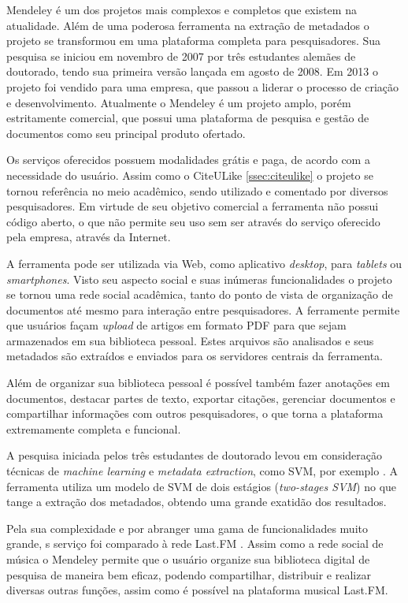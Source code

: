 \begin{textnew}

Mendeley é um dos projetos mais complexos e completos que existem na atualidade. Além de uma poderosa ferramenta na extração de metadados o projeto se transformou em uma plataforma completa para pesquisadores. Sua pesquisa se iniciou em novembro de 2007 por três estudantes alemães de doutorado, tendo sua primeira versão lançada em agosto de 2008. Em 2013 o projeto foi vendido para uma empresa, que passou a liderar o processo de criação e desenvolvimento. Atualmente o Mendeley é um projeto amplo, porém estritamente comercial, que possui uma plataforma de pesquisa e gestão de documentos como seu principal produto ofertado.

Os serviços oferecidos possuem modalidades grátis e paga, de acordo com a necessidade do usuário. Assim como o CiteULike \autoref{ssec:citeulike} o projeto se tornou referência no meio acadêmico, sendo utilizado e comentado por diversos pesquisadores. Em virtude de seu objetivo comercial a ferramenta não possui código aberto, o que não permite seu uso sem ser através do serviço oferecido pela empresa, através da Internet.

A ferramenta pode ser utilizada via Web, como aplicativo \emph{desktop}, para \emph{tablets} ou \emph{smartphones}. Visto seu aspecto social e suas inúmeras funcionalidades o projeto se tornou uma rede social acadêmica, tanto do ponto de vista de organização de documentos até mesmo para interação entre pesquisadores. A ferramente permite que usuários façam \emph{upload} de artigos em formato PDF para que sejam armazenados em sua biblioteca pessoal. Estes arquivos são analisados e seus metadados são extraídos e enviados para os servidores centrais da ferramenta.

Além de organizar sua biblioteca pessoal é possível também fazer anotações em documentos, destacar partes de texto, exportar citações, gerenciar documentos e compartilhar informações com outros pesquisadores, o que torna a plataforma extremamente completa e funcional.

A pesquisa iniciada pelos três estudantes de doutorado levou em consideração técnicas de \emph{machine learning} e \emph{metadata extraction}, como SVM, por exemplo \cite{Granitzer-2012-LayoutBased}. A ferramenta utiliza um modelo de SVM de dois estágios (\emph{two-stages SVM}) \cite{Han-SVM} no que tange a extração dos metadados, obtendo uma grande exatidão dos resultados.

Pela sua complexidade e por abranger uma gama de funcionalidades muito grande, s serviço foi comparado à rede Last.FM \cite{Mendeley-LastFM}. Assim como a rede social de música o Mendeley permite que o usuário organize sua biblioteca digital de pesquisa de maneira bem eficaz, podendo compartilhar, distribuir e realizar diversas outras funções, assim como é possível na plataforma musical Last.FM.


\end{textnew}
